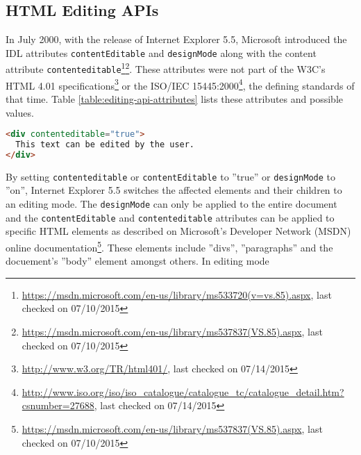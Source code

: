 \subsection{HTML Editing APIs}
\label{sec:html-editing-apis}

In July 2000, with the release of Internet Explorer 5.5, Microsoft introduced the IDL attributes \texttt{contentEditable} and \texttt{designMode} along with the content attribute \texttt{contenteditable}\footnote{\url{https://msdn.microsoft.com/en-us/library/ms533720(v=vs.85).aspx}, last checked on 07/10/2015}\footnote{\url{https://msdn.microsoft.com/en-us/library/ms537837(VS.85).aspx}, last checked on 07/10/2015}. These attributes were not part of the W3C's HTML 4.01 specifications\footnote{\url{http://www.w3.org/TR/html401/}, last checked on 07/14/2015} or the ISO/IEC 15445:2000\footnote{\url{http://www.iso.org/iso/iso\_catalogue/catalogue\_tc/catalogue\_detail.htm?csnumber=27688}, last checked on 07/14/2015}, the defining standards of that time. Table \ref{table:editing-api-attributes} lists these attributes and possible values.

\begin{table}[]
\centering
{}
\caption{Editing API attributes}
\label{table:editing-api-attributes}
\end{table}

\begin{lstlisting}[language=html, caption=An element set to editing mode, label=lst:div-contenteditable]
<div contenteditable="true">
  This text can be edited by the user.
</div>
\end{lstlisting}

By setting \texttt{contenteditable} or \texttt{contentEditable} to ''true'' or \texttt{designMode} to ''on'', Internet Explorer 5.5 switches the affected elements and their children to an editing mode. The \texttt{designMode} can only be applied to the entire document and the \texttt{contentEditable} and \texttt{contenteditable} attributes can be applied to specific HTML elements as described on Microsoft's Developer Network (MSDN) online documentation\footnote{\url{https://msdn.microsoft.com/en-us/library/ms537837(VS.85).aspx}, last checked on 07/10/2015}. These elements include ''divs'', ''paragraphs'' and the docuement's ''body'' element amongst others. In editing mode

